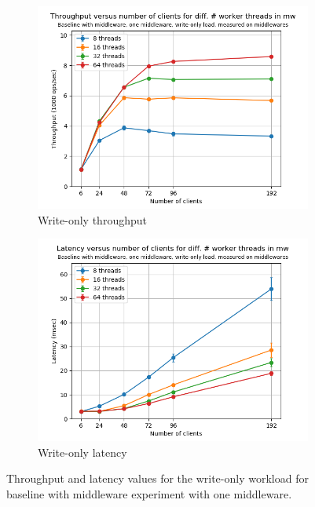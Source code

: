 \documentclass[11pt,a4paper]{article}
\begin{document}
\begin{figure}[h]
\centering
\begin{subfigure}{.5\textwidth}
  \centering
  \includegraphics[width=1.0\linewidth,trim={0px 0px 0px 0px},clip]{img/plot/mwb1-wo-tp_mw.png}
  \caption{Write-only throughput}
  \label{fig:mwb1-wo-tp_mw}
\end{subfigure}%
\begin{subfigure}{.5\textwidth}
  \centering
  \includegraphics[width=1.0\linewidth,trim={0px 0px 0px 0px},clip]{img/plot/mwb1-wo-lat_mw.png}
  \caption{Write-only latency}
  \label{fig:mwb1-wo-lat_mw}
\end{subfigure}
\caption{Throughput and latency values for the write-only workload for baseline with middleware experiment with one middleware.}
\label{fig:mwb1-wo_mw}
\end{figure}
\end{document}
